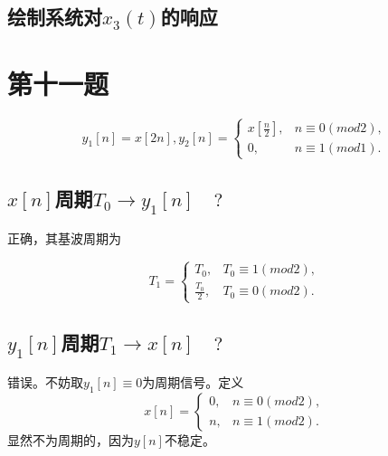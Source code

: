 \documentclass[UTF8, fontset=fandol,12pt, a4paper]{ctexart}
\begin{document}
\subsection{绘制系统对$x_3(t)$的响应}

\begin{center}
\end{center}

\section* {第十一题}

$$y_1[n] = x[2n], y_2[n] = \begin{cases}
  x[\frac{n}{2}], & n \equiv 0 (mod 2), \\
  0, & n \equiv 1 (mod 1).
\end{cases}$$

\subsection{$x[n]$周期$T_0 \longrightarrow y_1[n] \quad ?$}

正确，其基波周期为

$$ T_1 = \begin{cases}
  T_0, &T_0 \equiv 1(mod 2), \\
  \frac{T_0}{2}, &T_0 \equiv 0(mod 2).
\end{cases}$$

\subsection{$y_1[n]$周期$T_1 \longrightarrow x[n] \quad ?$}

错误。不妨取$y_1[n] \equiv 0$为周期信号。定义
$$ x[n] = \begin{cases}
  0, &n\equiv 0(mod 2), \\
  n, &n\equiv 1(mod 2).
\end{cases}$$
显然不为周期的，因为$y[n]$不稳定。
\end{document}
